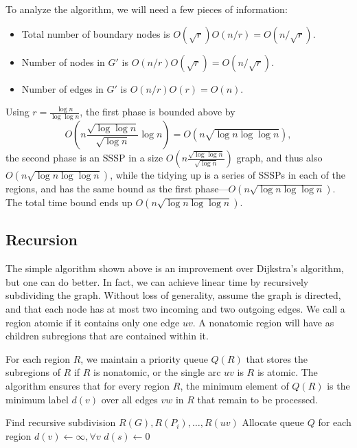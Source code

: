\documentclass[12pt]{article}
\begin{document}
To analyze the algorithm, we will need a few pieces of information:
\begin{itemize}
\item Total number of boundary nodes is $O(\sqrt{r})O(n/r) = O(n/\sqrt{r})$.
\item Number of nodes in $G'$ is $O(n/r)O(\sqrt{r})=O(n/\sqrt{r})$.
\item Number of edges in $G'$ is $O(n/r)O(r) = O(n)$.
\end{itemize}

Using $r=\frac{\log n}{\log \log n}$, the first phase is bounded above by
\[
  O\left(n\frac{\sqrt{\log \log n}}{\sqrt{\log n}} \log n\right)= O(n \sqrt{\log n \log \log n}),
\]
the second phase is an SSSP in a size $O(n \frac{\sqrt{\log \log n}}{\sqrt{\log n}})$ graph, and thus also $O(n \sqrt{\log n \log \log n})$, while the tidying up is a series of SSSPs in each of the regions, and has the same bound as the first phase---$O(n \sqrt{\log n \log \log n})$. The total time bound ends up $O(n \sqrt{\log n \log \log n})$.

\subsection{Recursion}
\label{sec:recursion}

The simple algorithm shown above is an improvement over Dijkstra's algorithm, but one can do better. In fact, we can achieve linear time by recursively subdividing the graph. Without loss of generality, assume the graph is directed, and that each node has at most two incoming and two outgoing edges. We call a region atomic if it contains only one edge $uv$. A nonatomic region will have as children subregions that are contained within it.

For each region $R$, we maintain a priority queue $Q(R)$ that stores the subregions of $R$ if $R$ is nonatomic, or the single arc $uv$ is $R$ is atomic. The algorithm ensures that for every region $R$, the minimum element of $Q(R)$ is the minimum label $d(v)$ over all edges $vw$ in $R$ that remain to be processed.


\begin{algorithm}
  \label{alg:linear}
  \begin{algorithmic}[1]
    \State Find recursive subdivision $R(G), R(P_i), \ldots, R(uv)$
    \State Allocate queue $Q$ for each region
    \State $d(v) \gets \infty, \forall v$
    \State $d(s) \gets 0$
      \State {}
    \EndFor
      \State {}
    \EndWhile
  \end{algorithmic}
\end{algorithm}
\end{document}
